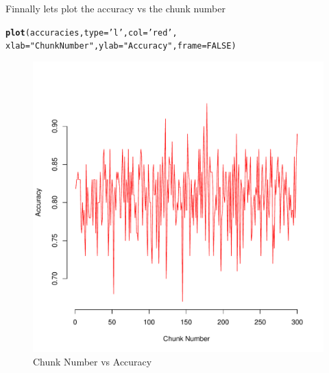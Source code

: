 \documentclass[10pt  ,usenames, dvipsnames]{article}\usepackage[]{graphicx}\usepackage[]{color}
\makeatletter
\def\maxwidth{ %
  \ifdim\Gin@nat@width>\linewidth
    \linewidth
  \else
    \Gin@nat@width
  \fi
}
\newcommand{\hlnum}[1]{\textcolor[rgb]{0.686,0.059,0.569}{#1}}%
\newcommand{\hlstr}[1]{\textcolor[rgb]{0.192,0.494,0.8}{#1}}%
\newcommand{\hlstd}[1]{\textcolor[rgb]{0.345,0.345,0.345}{#1}}%
\newcommand{\hlkwc}[1]{\textcolor[rgb]{0.333,0.667,0.333}{#1}}%
\newcommand{\hlkwd}[1]{\textcolor[rgb]{0.737,0.353,0.396}{\textbf{#1}}}%
\newenvironment{kframe}{%
 \def\at@end@of@kframe{}%
 \ifinner\ifhmode%
  \def\at@end@of@kframe{\end{minipage}}%
  \begin{minipage}{\columnwidth}%
 \fi\fi%
 \def\FrameCommand##1{\hskip\@totalleftmargin \hskip-\fboxsep
 \colorbox{shadecolor}{##1}\hskip-\fboxsep
     \hskip-\linewidth \hskip-\@totalleftmargin \hskip\columnwidth}%
 \MakeFramed {\advance\hsize-\width
   \@totalleftmargin\z@ \linewidth\hsize
   \@setminipage}}%
 {\par\unskip\endMakeFramed%
 \at@end@of@kframe}
\newenvironment{knitrout}{}{} %
\makeatother
\begin{document}
Finnally lets plot the accuracy vs the chunk number

\begin{knitrout}
\color{fgcolor}\begin{kframe}
\begin{alltt}
\hlkwd{plot}\hlstd{(accuracies,}\hlkwc{type}\hlstd{=}\hlstr{'l'}\hlstd{,}\hlkwc{col}\hlstd{=}\hlstr{'red'}\hlstd{,}
     \hlkwc{xlab}\hlstd{=}\hlstr{"Chunk Number"}\hlstd{,}\hlkwc{ylab}\hlstd{=}\hlstr{"Accuracy"}\hlstd{,}\hlkwc{frame}\hlstd{=}\hlnum{FALSE}\hlstd{)}
\end{alltt}
\end{kframe}
\end{knitrout}


\begin{figure}[H]
\begin{center}
\begin{knitrout}
\color{fgcolor}
\includegraphics[width=\maxwidth]{figure/unnamed-chunk-65-1} 

\end{knitrout}
\caption {Chunk Number vs Accuracy}
\label{fig2}
\end {center}
\end {figure}
\end{document}
